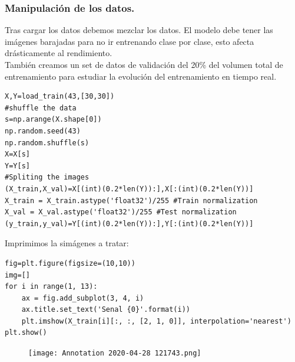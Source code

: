 \documentclass[a4paper,10pt]{article}
\begin{document}
\subsubsection{Manipulación de los datos.}
Tras cargar los datos debemos mezclar los datos. El modelo debe tener las imágenes barajadas para no ir entrenando clase por clase, esto afecta drásticamente al rendimiento. \\
También creamos un set de datos de validación del 20\% del volumen total de entrenamiento para estudiar la evolución del entrenamiento en tiempo real.
\begin{lstlisting}
X,Y=load_train(43,[30,30])
#shuffle the data
s=np.arange(X.shape[0])
np.random.seed(43)
np.random.shuffle(s)
X=X[s]
Y=Y[s]
#Spliting the images 
(X_train,X_val)=X[(int)(0.2*len(Y)):],X[:(int)(0.2*len(Y))]
X_train = X_train.astype('float32')/255 #Train normalization 
X_val = X_val.astype('float32')/255 #Test normalization
(y_train,y_val)=Y[(int)(0.2*len(Y)):],Y[:(int)(0.2*len(Y))]
\end{lstlisting}
Imprimimos la simágenes a tratar:
\begin{lstlisting}
fig=plt.figure(figsize=(10,10))
img=[]
for i in range(1, 13):
    ax = fig.add_subplot(3, 4, i)
    ax.title.set_text('Senal {0}'.format(i))
    plt.imshow(X_train[i][:, :, [2, 1, 0]], interpolation='nearest')
plt.show()
\end{lstlisting}
\begin{figure}[H]
\centering
\texttt{[image: Annotation 2020-04-28 121743.png]}

\end{figure}
\end{document}
